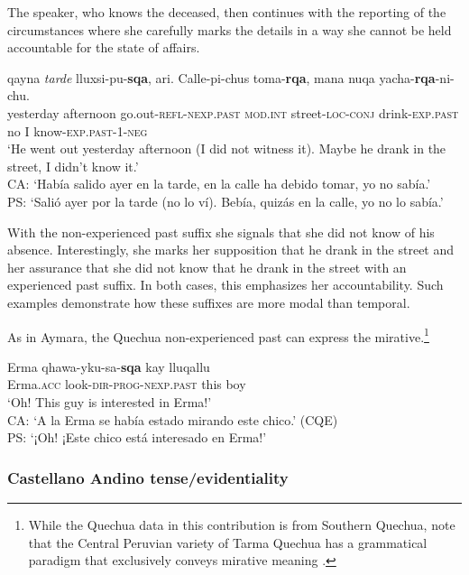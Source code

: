\documentclass[output=paper,hidelinks]{langscibook}
\begin{document}
The speaker, who knows the deceased, then continues with the reporting of the circumstances where she carefully marks the details in a way she cannot be held accountable for the state of affairs.

\ea \label{ex:Q-find2}
\gll qayna \textit{tarde} lluxsi-pu-\textbf{sqa}, ari. Calle-pi-chus toma-\textbf{rqa}, mana nuqa yacha-\textbf{rqa}-ni-chu. \\
yesterday afternoon go.out-\textsc{refl-nexp.past} \textsc{mod.int} street-\textsc{loc-conj} drink-\textsc{exp.past} no I know-\textsc{exp.past-1-neg} \\ 
\glt ‘He went out yesterday afternoon (I did not witness it). Maybe he drank in the street, I didn't know it.’ \citep[165]{soto2002interferencia} \\
CA: `Había salido ayer en la tarde, en la calle ha debido tomar, yo no sabía.'\\
PS: `Salió ayer por la tarde (no lo ví). Bebía, quizás en la calle, yo no lo sabía.'
\z

With the non-experienced past suffix she signals that she did not know of his absence. Interestingly, she marks her supposition that he drank in the street and her assurance that she did not know that he drank in the street with an experienced past suffix. In both cases, this emphasizes her accountability. Such examples demonstrate how these suffixes are more modal than temporal. 

As in Aymara, the Quechua non-experienced past can express the mirative.\footnote{While the Quechua data in this contribution is from Southern Quechua, note that the Central Peruvian variety of Tarma Quechua has a grammatical paradigm that exclusively conveys mirative meaning \citep{RN72}.} 

\ea
\gll Erma qhawa-yku-sa-\textbf{sqa} kay lluqallu \\
Erma.\textsc{acc} look-\textsc{dir-prog-nexp.past} this boy \\ \glt ‘Oh! This guy is interested in Erma!' \\
CA: `A la Erma se había estado mirando este chico.' (CQE)\\
PS: `¡Oh! ¡Este chico está interesado en Erma!'
\z

\subsubsection{Castellano Andino tense/evidentiality}
\end{document}
